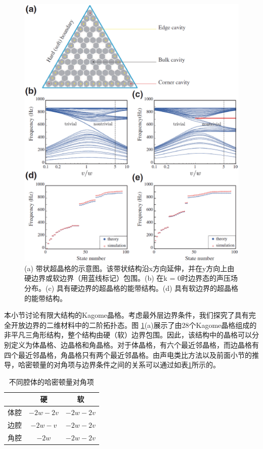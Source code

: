 \begin{figure}[h!]
  \centering
  \includegraphics[width=1\textwidth]{images/fig3-11.eps} 
  \caption{(a) 带状超晶格的示意图。该带状结构沿x方向延伸，并在y方向上由硬边界或软边界（用蓝线标记）包围。(b) 在k = 0时边界态的声压场分布。(c) 具有硬边界的超晶格的能带结构。(d) 具有软边界的超晶格的能带结构。}
  \label{fig_3_11}
\end{figure}


本小节讨论有限大结构的Kagome晶格。考虑最外层边界条件，我们探究了具有完全开放边界的二维材料中的二阶拓扑态。图 \ref{fig_3_11}(a)展示了由28个Kagome晶格组成的非平凡三角形结构，整个结构由硬（软）边界包围。因此，该结构中的晶格可以分别定义为体晶格、边晶格和角晶格。对于体晶格，有六个最近邻晶格，而边晶格有四个最近邻晶格，角晶格只有两个最近邻晶格。由声电类比方法以及前面小节的推导，哈密顿量的对角项与边界条件之间的关系可以通过如表\ref{table-1}所示的。

\begin{table}[h]
  \centering
  \caption{不同腔体的哈密顿量对角项}
  \label{table-1}
  \begin{tabular}{ccc}
  \hline
   & 硬 & 软 \\
  \hline
  体腔 & $-2w - 2v$ & $-2w - 2v$ \\
  边腔 & $-2w - v$ & $-2w - 2v$ \\
  角腔 & $-2w$ & $-2w - 2v$ \\
  \hline
  \end{tabular}
  \end{table}

